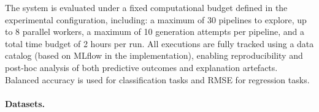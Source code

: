 \documentclass[runningheads]{llncs}
\begin{document}
The system is evaluated under a fixed computational budget defined in the experimental configuration, including:
a maximum of 30 pipelines to explore,
up to 8 parallel workers,
a maximum of 10 generation attempts per pipeline,
and a total time budget of 2 hours per run.
%
All executions are fully tracked using a data catalog (based on MLflow in the implementation),
enabling reproducibility and post-hoc analysis of both predictive outcomes and explanation artefacts.
Balanced accuracy is used for classification tasks and RMSE for regression tasks.

\paragraph{Datasets.}
\label{subsubsec:datasets}


\end{document}
